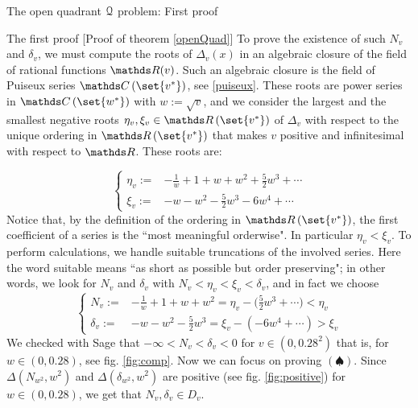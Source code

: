 \documentclass[11pt, a4paper, english, twoside, notitlepage, openright]{report}
\begin{document}
\begin{chapter}{The open quadrant $\mathcal{Q}$ problem: First proof}
\begin{section}{The first proof} [Proof of theorem \ref{openQuad}]
To prove the existence of such $N_v$ and $\delta_v$, we must compute the roots of $\Delta_v(x)$ in an algebraic closure of the field of rational functions $\R(v)$. Such an algebraic closure is the field of Puiseux series $\C\left(\set{v^*}\right)$, see \ref{puiseux}. These roots are power series in $\C\left(\set{w^*}\right)$ with $w:=\sqrt{v}$, and we consider the largest and the smallest negative roots $\eta_v,\xi_v\in\R\left(\set{v^*}\right)$ of $\Delta_v$ with respect to the unique ordering in $\R\left(\set{v^*}\right)$ that makes $v$ positive and infinitesimal with respect to $\R$. These roots are:
			
\begin{equation*}\left\{\begin{split}
\eta_v:=&-\frac{1}{w}+1+w+w^2+\frac{5}{2}w^3+\cdots\\
\xi_v:=&-w-w^2-\frac{5}{2}w^3-6w^4+\cdots
\end{split}\right.
\end{equation*}
Notice that, by the definition of the ordering in $\R\left(\set{v^*}\right)$, the first coefficient of a series is the ``most meaningful orderwise". In particular $\eta_v<\xi_v$. To perform calculations, we handle suitable truncations of the involved series. Here the word suitable means ``as short as possible but order preserving"; in other words, we look for $N_v$ and $\delta_v$ with $N_v<\eta_v<\xi_v<\delta_v$, and in fact we choose
\begin{equation*}\left\{
\begin{split}
N_v:=&-\frac{1}{w}+1+w+w^2=\eta_v-\Big(\frac{5}{2}w^3+\cdots\Big)<\eta_v\\
\delta_v:=&-w-w^2-\frac{5}{2}w^3=\xi_v-(-6w^4+\cdots)>\xi_v
\end{split}\right.
\end{equation*}
We checked with Sage that $-\infty<N_v<\delta_v<0$ for $v\in (0,0.28^2)$ that is, for $w\in(0,0.28)$, see fig. \ref{fig:comp}. Now we can focus on proving $(\spadesuit)$. Since $\Delta(N_{w^2},w^2)$ and $\Delta(\delta_{w^2},w^2)$ are positive (see fig. \ref{fig:positive}) for $w\in (0,0.28)$, we get that $N_v, \delta_v\in D_v$.
\begin{figure}[h]\hspace{-0.25cm}
\begin{subfigure}{.50\linewidth}\centering

\end{subfigure}
\end{figure}
\end{section}
\end{chapter}
\end{document}
